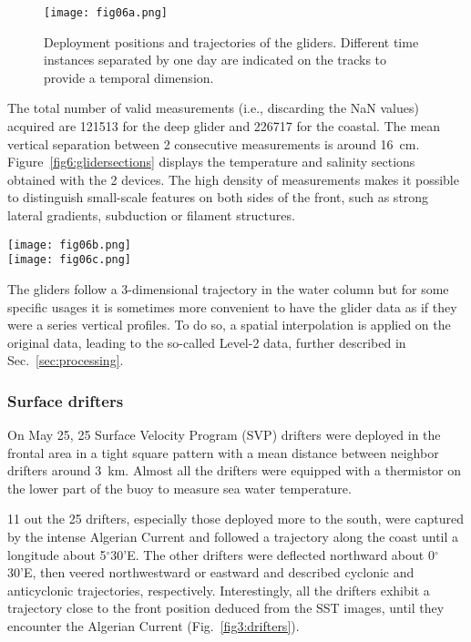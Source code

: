 \documentclass[essd]{copernicus}
\begin{document}
\begin{figure}[t]
\texttt{[image: fig06a.png]}
\caption{Deployment positions and trajectories of the gliders. Different time instances separated by one day are indicated on the tracks to provide a temporal dimension.\label{fig6:glidertracks}}
\end{figure}

The total number of valid measurements (i.e., discarding the NaN values) acquired are 121513 for the deep glider and 226717 for the coastal. The mean vertical separation between 2 consecutive measurements is around 16~cm. Figure~\ref{fig6:glidersections} displays the temperature and salinity sections obtained with the 2 devices. The high density of measurements makes it possible to distinguish small-scale features on both sides of the front, such as strong lateral gradients, subduction or filament structures.  

\begin{figure*}[t]
\texttt{[image: fig06b.png]}\\
\texttt{[image: fig06c.png]}
\caption{Temperature and salinity measured by the two gliders. The front position is shown as a dashed, grey line.\label{fig6:glidersections}}
\end{figure*}

The gliders follow a 3-dimensional trajectory in the water column but for some specific usages it is sometimes more convenient to have the glider data as if they were a series vertical profiles. To do so, a spatial interpolation is applied on the original data, leading to the so-called Level-2 data, further described in Sec.~\ref{sec:processing}.


\subsubsection{Surface drifters}

On May 25, 25 Surface Velocity Program (SVP) drifters were deployed in the frontal area in a tight square pattern with a mean distance between neighbor drifters around 3~km. Almost all the drifters were equipped with a thermistor on the lower part of the buoy to measure sea water temperature. 

11 out the 25 drifters, especially those deployed more to the south, were captured by the intense Algerian Current and followed a trajectory along the coast until a longitude about 5$^{\circ}$30'E. The other drifters were deflected northward about 0$^{\circ}$30'E, then veered northwestward or eastward 
and described cyclonic and anticyclonic trajectories, respectively. Interestingly, all the drifters exhibit a trajectory close to the front position deduced from the SST images, until they encounter the Algerian Current (Fig.~\ref{fig3:drifters}). 
\end{document}
